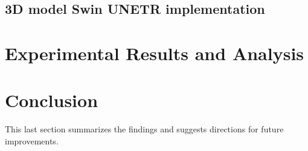 \documentclass{article}
\begin{document}
\subsection{3D model Swin UNETR implementation}

\subsubsection{}





\section{Experimental Results and Analysis}
\label{sec:results}
  

\section{Conclusion}
\label{sec:conc}
    This last section summarizes the findings and suggests directions for future improvements.



\vfill\pagebreak






\end{document}

